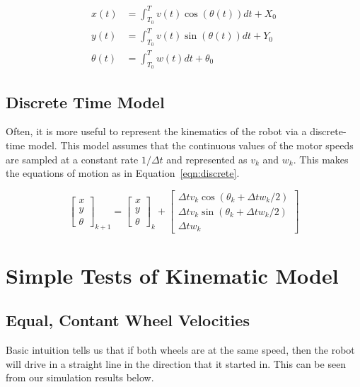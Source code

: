 \documentclass[10pt]{article}
\begin{document}
\begin{equation}
\begin{align}
 x(t) &= \int_{T_{0}}^{T} v(t) \cos{(\theta(t))} dt + X_{0} \\
 y(t) &= \int_{T_{0}}^{T} v(t) \sin{(\theta(t))} dt + Y_{0} \\
 \theta(t) &= \int_{T_{0}}^{T} w(t) dt + \theta_{0}
\end{align}
\label{eqn:integration}
\end{equation}

\subsection{Discrete Time Model}
Often, it is more useful to represent the kinematics of the robot via a discrete-time model.  This model assumes that the continuous values of the motor speeds are sampled at a 
constant rate $1/\Delta t$ and represented as $v_k$ and $w_k$.  This makes the equations of motion as in Equation~\ref{eqn:discrete}.

\begin{equation}
 \begin{bmatrix}
  x \\ y \\ \theta
 \end{bmatrix}_{k+1} = 
 \begin{bmatrix}
  x \\ y \\ \theta
 \end{bmatrix}_{k} + 
 \begin{bmatrix}
  \Delta t v_k \cos{(\theta_k + \Delta t w_k/2)}\\
  \Delta t v_k \sin{(\theta_k + \Delta t w_k/2)}\\
  \Delta t w_k
 \end{bmatrix}
\label{eqn:discrete}
\end{equation}

\clearpage
\section{Simple Tests of Kinematic Model}
\subsection{Equal, Contant Wheel Velocities}
Basic intuition tells us that if both wheels are at the same speed, then the robot will drive in a straight line in the direction that it started in.  This can be seen from our simulation results below.
\end{document}
